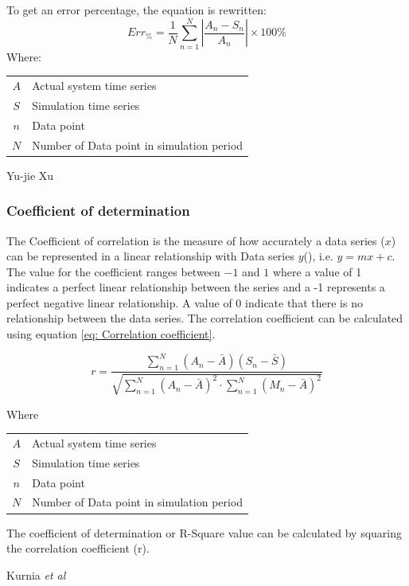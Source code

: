  			To get	an error percentage, the equation is rewritten:	
 			\begin{equation}
 			\label{eq: Relative error}
 			Err_{\%} = \dfrac{1}{N}\sum_{n=1}^{N}{\left|\dfrac{A_{n} - S_{n}}{A_{n}}\right| }\times 100 \%
 			\end{equation}
 			Where: \par
 			\begin{table}[h!]
 				\centering
 				\begin{tabular}{cl}
 					$A$ & Actual system time series \\
 					$S$ & Simulation time series \\
 					$n$ & Data point \\
 					$N$ & Number of Data point in simulation period \\
 				\end{tabular} 
 			\end{table}	
 		Yu-jie Xu \cite{xu2016modeling}
 		\par 
 		\subsubsection{Coefficient of determination}
 		The Coefficient of correlation is the measure of how accurately a data series ($ x $) can be represented in a linear relationship with Data series $ y $(), i.e. $ y = mx+c$. The value for the coefficient ranges between $ -1 $ and $ 1 $ where a value of 1 indicates a perfect linear relationship between the series and a -1 represents a perfect negative linear relationship. A value of 0 indicate that there is no relationship between the data series. The correlation coefficient can be calculated using equation \cref{eq: Correlation coefficient}.\cite{sarin2010comparing}
 		
 		\begin{equation}
 		\label{eq: Correlation coefficient}
 		r = \dfrac{\sum_{n=1}^{N}(A_n - \bar{A})(S_n - \bar{S})}{\sqrt{\sum_{n=1}^{N}(A_n - \bar{A})^2 \cdot \sum_{n=1}^{N}(M_n - \bar{A})^2}}
 		\end{equation}
 		\par
 		Where \par
 		\begin{table}[h!]
 			\centering
 			\begin{tabular}{cl}
 				$A$ & Actual system time series \\
 				$S$ & Simulation time series \\
 				$n$ & Data point \\
 				$N$ & Number of Data point in simulation period \\
 			\end{tabular} 
 		\end{table}	
 		The coefficient of determination or R-Square value can be calculated by squaring the correlation coefficient (r). 
 		\par 
 			Kurnia \textit{et al} \cite{kurnia2014simulation} 
